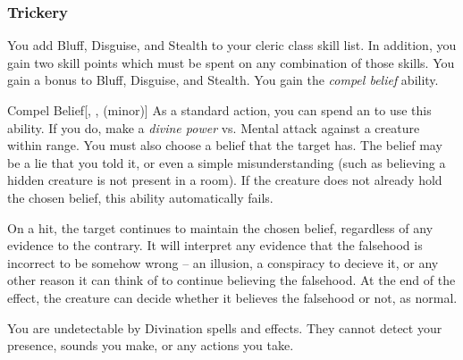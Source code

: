         \subsubsection{Trickery}
             You add Bluff, Disguise, and Stealth to your cleric class skill list.
            In addition, you gain two skill points which must be spent on any combination of those skills.
             You gain a  bonus to Bluff, Disguise, and Stealth.
             You gain the \textit{compel belief} ability.
            \begin{ability}{Compel Belief}[, ,  (minor)]
                As a standard action, you can spend an  to use this ability.
                If you do, make a \textit{divine power} vs. Mental attack against a creature within \rngmed range.
                You must also choose a belief that the target has.
                The belief may be a lie that you told it, or even a simple misunderstanding (such as believing a hidden creature is not present in a room).
                If the creature does not already hold the chosen belief, this ability automatically fails.

                On a hit, the target continues to maintain the chosen belief, regardless of any evidence to the contrary.
                It will interpret any evidence that the falsehood is incorrect to be somehow wrong -- an illusion, a conspiracy to decieve it, or any other reason it can think of to continue believing the falsehood.
                At the end of the effect, the creature can decide whether it believes the falsehood or not, as normal.
            \end{ability}
             You are undetectable by Divination spells and effects.
            They cannot detect your presence, sounds you make, or any actions you take.

